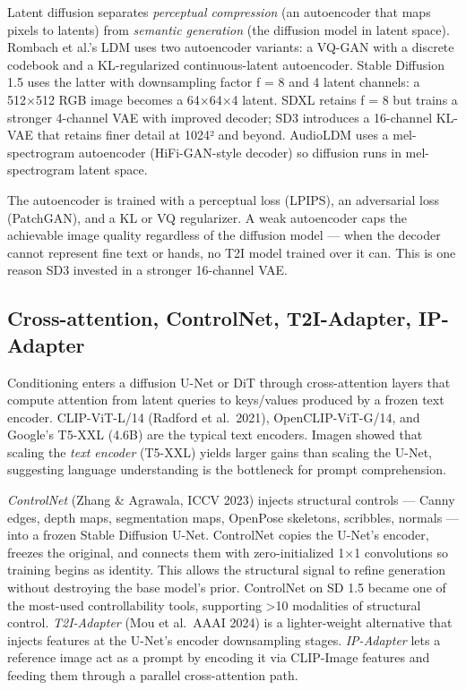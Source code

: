 Latent diffusion separates \emph{perceptual compression} (an autoencoder that maps pixels to latents) from \emph{semantic generation} (the diffusion model in latent space). Rombach et al.'s LDM uses two autoencoder variants: a VQ-GAN with a discrete codebook and a KL-regularized continuous-latent autoencoder. Stable Diffusion 1.5 uses the latter with downsampling factor f = 8 and 4 latent channels: a 512×512 RGB image becomes a 64×64×4 latent. SDXL retains f = 8 but trains a stronger 4-channel VAE with improved decoder; SD3 introduces a 16-channel KL-VAE that retains finer detail at 1024² and beyond. AudioLDM uses a mel-spectrogram autoencoder (HiFi-GAN-style decoder) so diffusion runs in mel-spectrogram latent space.

The autoencoder is trained with a perceptual loss (LPIPS), an adversarial loss (PatchGAN), and a KL or VQ regularizer. A weak autoencoder caps the achievable image quality regardless of the diffusion model --- when the decoder cannot represent fine text or hands, no T2I model trained over it can. This is one reason SD3 invested in a stronger 16-channel VAE.

\subsection{Cross-attention, ControlNet, T2I-Adapter, IP-Adapter}\label{cross-attention-controlnet-t2i-adapter-ip-adapter}

Conditioning enters a diffusion U-Net or DiT through cross-attention layers that compute attention from latent queries to keys/values produced by a frozen text encoder. CLIP-ViT-L/14 (Radford et al.~2021), OpenCLIP-ViT-G/14, and Google's T5-XXL (4.6B) are the typical text encoders. Imagen showed that scaling the \emph{text encoder} (T5-XXL) yields larger gains than scaling the U-Net, suggesting language understanding is the bottleneck for prompt comprehension.

\emph{ControlNet} (Zhang \& Agrawala, ICCV 2023) injects structural controls --- Canny edges, depth maps, segmentation maps, OpenPose skeletons, scribbles, normals --- into a frozen Stable Diffusion U-Net. ControlNet copies the U-Net's encoder, freezes the original, and connects them with zero-initialized 1×1 convolutions so training begins as identity. This allows the structural signal to refine generation without destroying the base model's prior. ControlNet on SD 1.5 became one of the most-used controllability tools, supporting \textgreater10 modalities of structural control. \emph{T2I-Adapter} (Mou et al.~AAAI 2024) is a lighter-weight alternative that injects features at the U-Net's encoder downsampling stages. \emph{IP-Adapter} lets a reference image act as a prompt by encoding it via CLIP-Image features and feeding them through a parallel cross-attention path.

